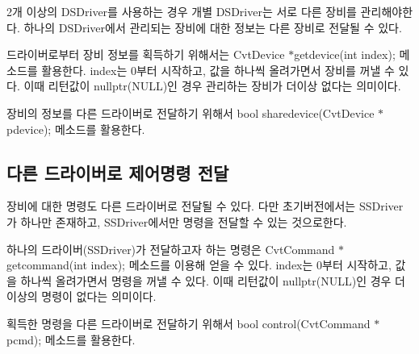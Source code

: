 2개 이상의 D\+S\+Driver를 사용하는 경우 개별 D\+S\+Driver는 서로 다른 장비를 관리해야한다. 하나의 D\+S\+Driver에서 관리되는 장비에 대한 정보는 다른 장비로 전달될 수 있다.

드라이버로부터 장비 정보를 획득하기 위해서는 Cvt\+Device $\ast$getdevice(int index); 메소드를 활용한다. index는 0부터 시작하고, 값을 하나씩 올려가면서 장비를 꺼낼 수 있다. 이때 리턴값이 nullptr(\+N\+U\+L\+L)인 경우 관리하는 장비가 더이상 없다는 의미이다.

장비의 정보를 다른 드라이버로 전달하기 위해서 bool sharedevice(\+Cvt\+Device $\ast$pdevice); 메소드를 활용한다.

\subsection*{다른 드라이버로 제어명령 전달}

장비에 대한 명령도 다른 드라이버로 전달될 수 있다. 다만 초기버전에서는 S\+S\+Driver가 하나만 존재하고, S\+S\+Driver에서만 명령을 전달할 수 있는 것으로한다.

하나의 드라이버(\+S\+S\+Driver)가 전달하고자 하는 명령은 Cvt\+Command $\ast$getcommand(int index); 메소드를 이용해 얻을 수 있다. index는 0부터 시작하고, 값을 하나씩 올려가면서 명령을 꺼낼 수 있다. 이때 리턴값이 nullptr(\+N\+U\+L\+L)인 경우 더이상의 명령이 없다는 의미이다.

획득한 명령을 다른 드라이버로 전달하기 위해서 bool control(\+Cvt\+Command $\ast$pcmd); 메소드를 활용한다. 